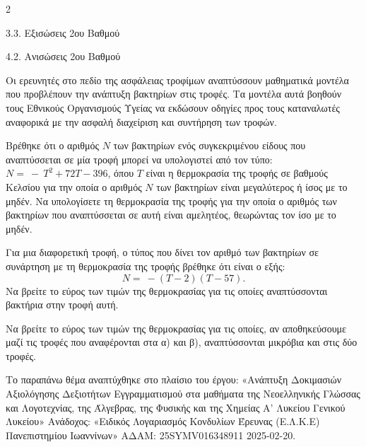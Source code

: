 \begin{ylh}{2}
    \item 3.3. Εξισώσεις 2ου Βαθμού
    \item 4.2. Ανισώσεις 2ου Βαθμού
\end{ylh}
Οι ερευνητές στο πεδίο της ασφάλειας τροφίμων αναπτύσσουν μαθηματικά μοντέλα που προβλέπουν την ανάπτυξη βακτηρίων στις τροφές. Τα μοντέλα αυτά βοηθούν τους Εθνικούς Οργανισμούς Υγείας να εκδώσουν οδηγίες προς τους καταναλωτές αναφορικά με την ασφαλή διαχείριση και συντήρηση των τροφών.
\begin{alist}
\item Βρέθηκε ότι ο αριθμός $N$ των βακτηρίων ενός συγκεκριμένου είδους που αναπτύσσεται σε μία τροφή μπορεί να υπολογιστεί από τον τύπο:
$N = \  - \ T^{2} + 72T - 396$,
όπου $T$ είναι η θερμοκρασία της τροφής σε βαθμούς Κελσίου για την οποία ο αριθμός $N$ των βακτηρίων είναι μεγαλύτερος ή ίσος με το μηδέν. Να υπολογίσετε τη θερμοκρασία της τροφής για την οποία ο αριθμός των βακτηρίων που αναπτύσσεται σε αυτή είναι αμελητέος, θεωρώντας τον ίσο με το μηδέν.
\item Για μια διαφορετική τροφή, ο τύπος που δίνει τον αριθμό των βακτηρίων σε συνάρτηση με τη θερμοκρασία της τροφής βρέθηκε ότι είναι ο εξής:
\begin{equation*}N = \  - (T - 2)(T - 57).\end{equation*}
Να βρείτε το εύρος των τιμών της θερμοκρασίας για τις οποίες αναπτύσσονται βακτήρια στην τροφή αυτή.
\item Να βρείτε το εύρος των τιμών της θερμοκρασίας για τις οποίες, αν αποθηκεύσουμε μαζί τις τροφές που αναφέρονται στα α) και β), αναπτύσσονται μικρόβια και στις δύο τροφές.

{\footnotesize Το παραπάνω θέμα αναπτύχθηκε στο πλαίσιο του έργου: «Ανάπτυξη Δοκιμασιών Αξιολόγησης Δεξιοτήτων Εγγραμματισμού στα μαθήματα της Νεοελληνικής Γλώσσας και Λογοτεχνίας, της Άλγεβρας, της Φυσικής και της Χημείας Α' Λυκείου Γενικού Λυκείου» Ανάδοχος: «Ειδικός Λογαριασμός Κονδυλίων Έρευνας (Ε.Λ.Κ.Ε) Πανεπιστημίου Ιωαννίνων» ΑΔΑΜ: 25SYMV016348911 2025-02-20.}
\end{alist}


